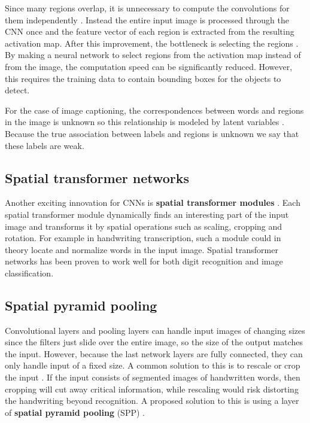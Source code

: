 Since many regions overlap, it is unnecessary to compute the convolutions for them independently \cite{FastRCNN}. Instead the entire input image is processed through the CNN once and the feature vector of each region is extracted from the resulting activation map. After this improvement, the bottleneck is selecting the regions \cite{FasterRCNN}. By making a neural network to select regions from the activation map instead of from the image, the computation speed can be significantly reduced. However, this requires the training data to contain bounding boxes for the objects to detect.

For the case of image captioning, the correspondences between words and regions in the image is unknown so this relationship is modeled by latent variables \cite{VisualSemanticAlignment}. Because the true association between labels and regions is unknown we say that these labels are weak.

\subsection{Spatial transformer networks}

Another exciting innovation for CNNs is \textbf{spatial transformer modules} \cite{SpatialTransformerNetworks}. Each spatial transformer module dynamically finds an interesting part of the input image and transforms it by spatial operations such as scaling, cropping and rotation. For example in handwriting transcription, such a module could in theory locate and normalize words in the input image. Spatial transformer networks has been proven to work well for both digit recognition and image classification.

\subsection{Spatial pyramid pooling}

Convolutional layers and pooling layers can handle input images of changing sizes since the filters just slide over the entire image, so the size of the output matches the input.
However, because the last network layers are fully connected, they can only handle input of a fixed size. A common solution to this is to rescale or crop the input \cite{FornesCnnCategorization}. If the input consists of segmented images of handwritten words, then cropping will cut away critical information, while rescaling would risk distorting the handwriting beyond recognition. A proposed solution to this is using a layer of \textbf{spatial pyramid pooling} (SPP) \cite{FornesCnnCategorization}.



